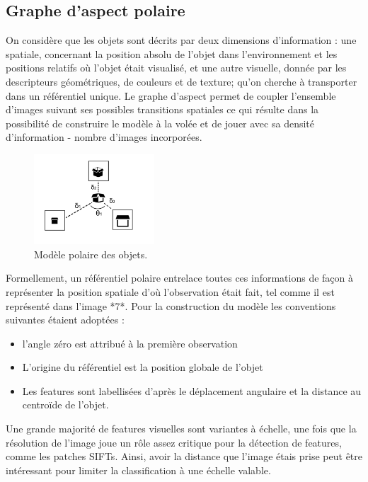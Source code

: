 \subsection {Graphe d'aspect polaire}

On considère que les objets sont décrits par deux dimensions
d'information : une spatiale, concernant la position absolu de l'objet
dans l'environnement et les positions relatifs où l'objet était
visualisé, et une autre visuelle, donnée par les descripteurs
géométriques, de couleurs et de texture; qu'on cherche à transporter
dans un référentiel unique. Le graphe d'aspect permet de coupler
l'ensemble d'images suivant ses possibles transitions spatiales ce qui
résulte dans la possibilité de construire le modèle à la volée et de
jouer avec sa densité d'information - nombre d'images incorporées.

\begin{figure}[H]
  \centering
  \includegraphics[width=0.4\textwidth]{object_model.png}
  \caption{Modèle polaire des objets.}
\end{figure}

Formellement, un référentiel polaire entrelace toutes ces informations
de façon à représenter la position spatiale d'où l'observation était
fait, tel comme il est représenté dans l'image *7*. Pour la
construction du modèle les conventions suivantes étaient adoptées :
\begin{itemize}
\item l'angle zéro est attribué à la première observation
\item L'origine du référentiel est la position globale de l’objet
\item Les features sont labellisées d'après le déplacement angulaire
  et la distance au centroïde de l'objet.
\end{itemize}

Une grande majorité de features visuelles sont variantes à échelle, une
fois que la résolution de l’image joue un rôle assez critique pour la
détection de features, comme les patches SIFTs. Ainsi, avoir la distance
que l’image étais prise peut être intéressant pour limiter la
classification à une échelle valable.